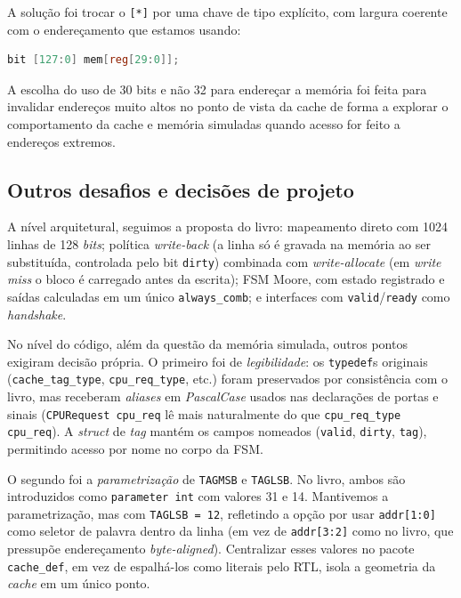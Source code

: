 \documentclass[12pt]{article}
\begin{document}
A solução foi trocar o \texttt{[*]} por uma chave de tipo explícito, com largura coerente com o endereçamento que estamos usando:

\begin{lstlisting}[language=Verilog]
bit [127:0] mem[reg[29:0]];
\end{lstlisting}

A escolha do uso de 30 bits e não 32 para endereçar a memória foi feita para invalidar endereços muito altos no ponto de vista da cache de forma a explorar o comportamento da cache e memória simuladas quando acesso for feito a endereços extremos.

\subsection{Outros desafios e decisões de projeto}

A nível arquitetural, seguimos a proposta do livro: mapeamento direto com 1024 linhas de 128
\emph{bits}; política \emph{write-back} (a linha só é gravada na
memória ao ser substituída, controlada pelo bit \texttt{dirty})
combinada com \emph{write-allocate} (em \emph{write miss} o bloco
é carregado antes da escrita); FSM Moore, com estado registrado e
saídas calculadas em um único \texttt{always\_comb}; e interfaces
com \texttt{valid}/\texttt{ready} como \emph{handshake}.

No nível do código, além da questão da memória simulada, outros pontos exigiram decisão própria. O
primeiro foi de \emph{legibilidade}: os \texttt{typedef}s originais
(\texttt{cache\_tag\_type}, \texttt{cpu\_req\_type}, etc.) foram
preservados por consistência com o livro, mas receberam
\emph{aliases} em \emph{PascalCase} usados nas declarações de
portas e sinais (\texttt{CPURequest cpu\_req} lê mais
naturalmente do que \texttt{cpu\_req\_type cpu\_req}). A
\emph{struct} de \emph{tag} mantém os campos nomeados
(\texttt{valid}, \texttt{dirty}, \texttt{tag}), permitindo acesso
por nome no corpo da FSM.

O segundo foi a \emph{parametrização} de \texttt{TAGMSB} e
\texttt{TAGLSB}. No livro, ambos são introduzidos como
\texttt{parameter int} com valores 31 e 14. Mantivemos a
parametrização, mas com \texttt{TAGLSB = 12}, refletindo a opção
por usar \texttt{addr[1:0]} como seletor de palavra dentro da linha
(em vez de \texttt{addr[3:2]} como no livro, que pressupõe
endereçamento \emph{byte-aligned}). Centralizar esses valores no
pacote \texttt{cache\_def}, em vez de espalhá-los como literais
pelo RTL, isola a geometria da \emph{cache} em um único ponto.
\end{document}
